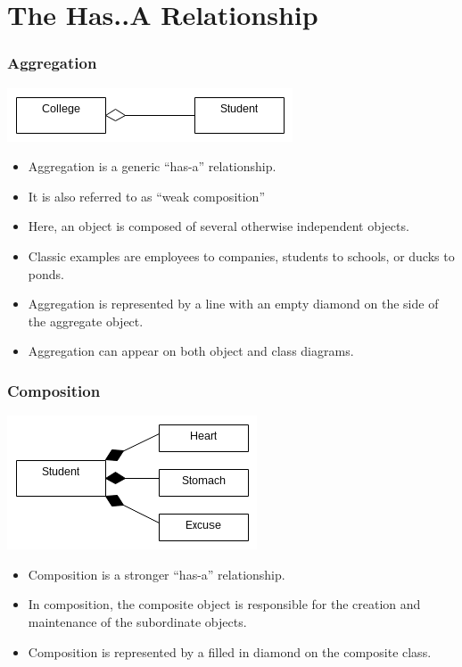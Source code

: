 \documentclass{beamer}
\begin{document}
\section{The Has..A Relationship}
\begin{frame}
    \frametitle{Aggregation}
    \begin{center}
        \includegraphics[height=0.2\textheight]{images/aggregation}
    \end{center}
    \begin{itemize}[<+->]
        \item Aggregation is a generic ``has-a'' relationship.
        \item It is also referred to as ``weak composition''
        \item Here, an object is composed of several otherwise independent
            objects.
        \item Classic examples are employees to companies,
            students to schools, or ducks to ponds.
        \item Aggregation is represented by a line with an empty diamond
            on the side of the aggregate object.
        \item Aggregation can appear on both object and class diagrams.
    \end{itemize}
\end{frame}

\begin{frame}
    \frametitle{Composition}
    \begin{center}
        \includegraphics[height=0.3\textheight]{images/composition}
    \end{center}
    \begin{itemize}[<+->]
        \item Composition is a stronger ``has-a'' relationship.
        \item In composition, the composite object is responsible for
            the creation and maintenance of the subordinate objects.
        \item Composition is represented by a filled in diamond on the
            composite class.
    \end{itemize}
\end{frame}
\end{document}
